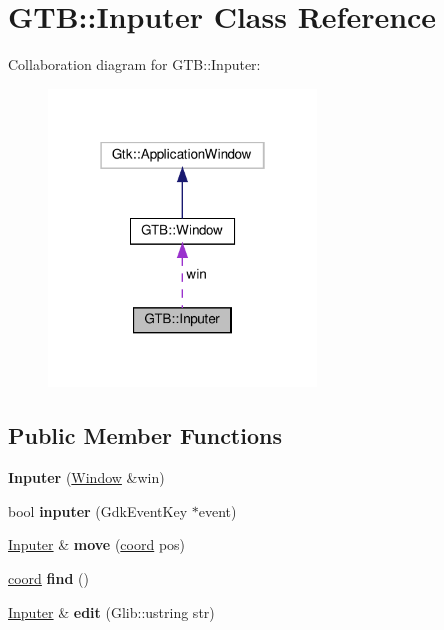 \hypertarget{a00044}{}\section{G\+TB\+:\+:Inputer Class Reference}
\label{a00044}


Collaboration diagram for G\+TB\+:\+:Inputer\+:\nopagebreak
\begin{figure}[H]
\begin{center}
\leavevmode
\includegraphics[width=202pt]{a00042}
\end{center}
\end{figure}
\subsection*{Public Member Functions}
\begin{DoxyCompactItemize}
\item 
\mbox{\label{a00044_ae2a8db83378f9ba8bf19e4bf8531cf7d}} 
{\bfseries Inputer} (\hyperlink{a00036}{Window} \&win)
\item 
\mbox{\label{a00044_a2cb5c87ba92fe20f19996490a8096680}} 
bool {\bfseries inputer} (Gdk\+Event\+Key $\ast$event)
\item 
\mbox{\label{a00044_a4da7991373f7f076f20ad31074c4fb8f}} 
\hyperlink{a00044}{Inputer} \& {\bfseries move} (\hyperlink{a00024}{coord} pos)
\item 
\mbox{\label{a00044_a5e7f591d5e30de5897274e5d16f13094}} 
\hyperlink{a00024}{coord} {\bfseries find} ()
\item 
\mbox{\label{a00044_a20d77d58027c7424b66eef37f37d38fc}} 
\hyperlink{a00044}{Inputer} \& {\bfseries edit} (Glib\+::ustring str)
\end{DoxyCompactItemize}
